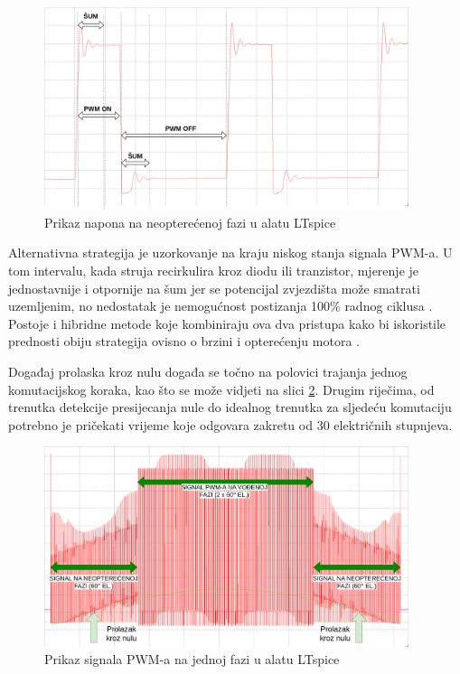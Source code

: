 \documentclass[diplomskirad]{fer}
\begin{document}
\begin{figure}[h!]
	\centering
	\includegraphics[width=0.95\textwidth]{Figures/pwm_sum.png}
	\caption{Prikaz napona na neopterećenoj fazi u alatu LTspice}
	\label{fig:pwm_sum}
\end{figure}

Alternativna strategija je uzorkovanje na kraju niskog stanja signala PWM-a. U
tom intervalu, kada struja recirkulira kroz diodu ili tranzistor, mjerenje je
jednostavnije i otpornije na šum jer se potencijal zvjezdišta može smatrati
uzemljenim, no nedostatak je nemogućnost postizanja 100\% radnog ciklusa
\label{text:pwm_off}. Postoje i hibridne metode koje kombiniraju ova dva
pristupa kako bi iskoristile prednosti obiju strategija ovisno o brzini i
opterećenju motora \cite{ST_AN1946}.

Događaj prolaska kroz nulu događa se točno na polovici trajanja jednog
komutacijskog koraka, kao što se može vidjeti na slici \ref{fig:pwm_drive}.
Drugim riječima, od trenutka detekcije presijecanja nule do idealnog trenutka
za sljedeću komutaciju potrebno je pričekati vrijeme koje odgovara zakretu od
30 električnih stupnjeva.

\begin{figure}[h!]
	\centering
	\includegraphics[width=0.95\textwidth]{Figures/pwm_drive_deg.png}
	\caption{Prikaz signala PWM-a na jednoj fazi u alatu LTspice}
	\label{fig:pwm_drive}
\end{figure}
\end{document}
